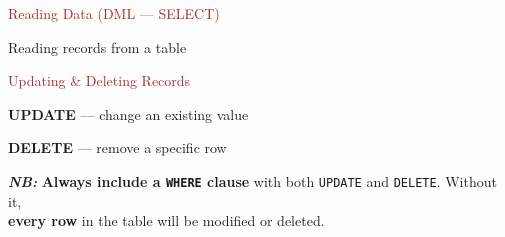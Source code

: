 \begin{frame}[fragile]{\textcolor{brown}{Reading Data (DML — SELECT)}}

\begin{block}{Reading records from a table}

\end{block}
\end{frame}

\begin{frame}[fragile]{\textcolor{brown}{Updating \& Deleting Records}}
  \begin{block}{\textbf{UPDATE} — change an existing value}

\end{block}

  \vspace{0.3em}
\begin{block}{\textbf{DELETE} — remove a specific row}

\end{block}

  \vspace{0.3em}
  \emph{\textbf{NB: }}\textbf{Always include a \texttt{WHERE} clause} with both \texttt{UPDATE} and \texttt{DELETE}.
    Without it, \\[4pt]
  \textbf{every row} in the table will be modified or deleted.
\end{frame}